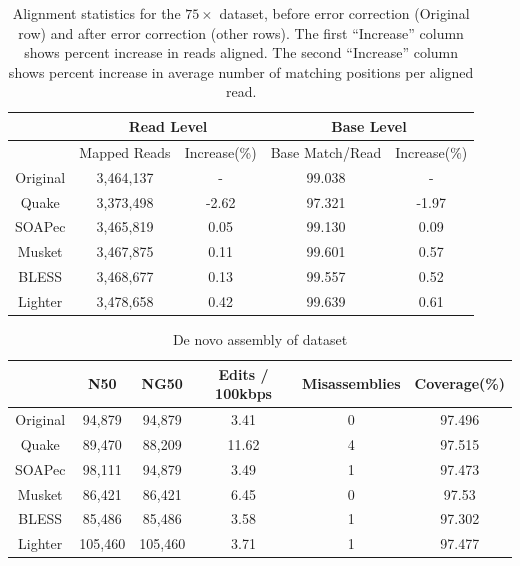 \documentclass{bmcart}
\begin{document}
\begin{backmatter}
\begin{table}[h!] %
\caption{Alignment statistics for the $75\times$ \ecoli dataset, before error correction (Original row) and after error correction (other rows).  The first ``Increase'' column shows percent increase in reads aligned.  The second ``Increase'' column shows percent increase in average number of matching positions per aligned read.}
\begin{tabular}{|c|c|c||c|c|} \hline
	 & \multicolumn{2}{|c||}{Read Level} & \multicolumn{2}{|c|}{Base Level} \\ \hline
     & Mapped Reads & Increase(\%) & Base Match/Read & Increase(\%) \\ \hline
Original & 	3,464,137	 & - & 99.038	& - \\ \hline
Quake	& 3,373,498	& -2.62	& 97.321	& -1.97  \\ \hline
SOAPec  & 3,465,819 & 0.05 &  99.130 & 0.09 \\ \hline
Musket	& 3,467,875	& 0.11	& 99.601	& 0.57  \\ \hline
BLESS	& 3,468,677& 0.13	& 99.557	& 0.52  \\ \hline
Lighter	&  3,478,658	& 0.42	& 99.639	& 0.61  \\ \hline
\end{tabular}
\end{table}

\begin{table}[h!] %
\caption{De novo assembly of \ecoli dataset}
\begin{tabular}{|c|c|c|c|c|c|} \hline
	 	& N50 &	NG50	 & Edits / 100kbps&	Misassemblies	& Coverage(\%) \\ \hline
Original &	94,879 &	94,879	& 3.41	& 0	& 97.496  \\ \hline
Quake	& 89,470 &	88,209	& 11.62	& 4	 & 97.515  \\ \hline
SOAPec	& 98,111 &	94,879	& 3.49	& 1	& 97.473	\\ \hline
Musket	& 86,421  &	86,421	& 6.45	& 0	 & 97.53 \\ \hline
BLESS	& 85,486  &	85,486	& 3.58	& 1	& 97.302  \\ \hline
Lighter	& 105,460 &	105,460	& 3.71	& 1	& 97.477  \\ \hline

\end{tabular}
\end{table}



\end{backmatter}
\end{document}
